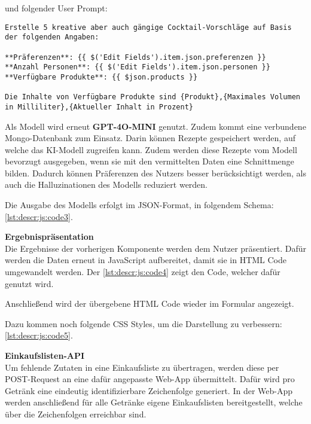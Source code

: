 und folgender User Prompt:
\begin{verbatim}
Erstelle 5 kreative aber auch gängige Cocktail-Vorschläge auf Basis der folgenden Angaben:

**Präferenzen**: {{ $('Edit Fields').item.json.preferenzen }}
**Anzahl Personen**: {{ $('Edit Fields').item.json.personen }}
**Verfügbare Produkte**: {{ $json.products }}

Die Inhalte von Verfügbare Produkte sind {Produkt},{Maximales Volumen in Milliliter},{Aktueller Inhalt in Prozent}
\end{verbatim}

Als Modell wird erneut \textbf{GPT-4O-MINI} genutzt.
Zudem kommt eine verbundene Mongo-Datenbank zum Einsatz. Darin können Rezepte gespeichert werden,
auf welche das KI-Modell zugreifen kann. Zudem werden diese Rezepte vom Modell bevorzugt ausgegeben,
wenn sie mit den vermittelten Daten eine Schnittmenge bilden. Dadurch können Präferenzen des Nutzers
besser berücksichtigt werden, als auch die Halluzinationen des Modells reduziert werden.

Die Ausgabe des Modells erfolgt im JSON-Format, in folgendem Schema: \autoref{lst:descr:js:code3}.

\textbf{Ergebnispräsentation} \\
Die Ergebnisse der vorherigen Komponente werden dem Nutzer präsentiert. Dafür werden die Daten
erneut in JavaScript aufbereitet, damit sie in HTML Code umgewandelt werden. Der
\autoref{lst:descr:js:code4} zeigt den Code, welcher dafür genutzt wird.

Anschließend wird der übergebene HTML Code wieder im Formular angezeigt.

Dazu kommen noch folgende CSS Styles, um die Darstellung zu verbessern: \autoref{lst:descr:js:code5}.

\textbf{Einkaufslisten-API} \\
Um fehlende Zutaten in eine Einkaufsliste zu übertragen, werden diese per POST-Request an eine dafür
angepasste Web-App übermittelt. Dafür wird pro Getränk eine eindeutig identifizierbare Zeichenfolge
generiert. In der Web-App werden anschließend für alle Getränke eigene Einkaufslisten
bereitgestellt, welche über die Zeichenfolgen erreichbar sind.
